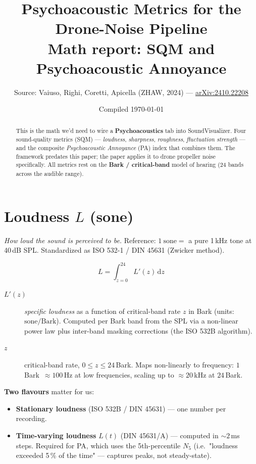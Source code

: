 \documentclass[11pt,a4paper]{article}
\title{\textbf{Psychoacoustic Metrics for the Drone-Noise Pipeline}\\
       \large Math report: SQM and Psychoacoustic Annoyance}
\author{Source: Vaiuso, Righi, Coretti, Apicella (ZHAW, 2024) ---
        \href{https://arxiv.org/abs/2410.22208}{arXiv:2410.22208}}
\date{Compiled \today}
\begin{document}
\maketitle

\begin{abstract}
\noindent
This is the math we'd need to wire a \textbf{Psychoacoustics} tab into SoundVisualizer.
Four sound-quality metrics (SQM) --- \emph{loudness}, \emph{sharpness}, \emph{roughness},
\emph{fluctuation strength} --- and the composite \emph{Psychoacoustic Annoyance} (PA)
index that combines them. The framework predates this paper; the paper applies it to
drone propeller noise specifically. All metrics rest on the \textbf{Bark / critical-band}
model of hearing (24 bands across the audible range).
\end{abstract}

\section{Loudness \texorpdfstring{$L$}{L} (sone)}

\textit{How loud the sound is perceived to be.} Reference: $1\ \text{sone} = $ a pure 1\,kHz
tone at 40\,dB SPL. Standardized as ISO 532-1 / DIN 45631 (Zwicker method).

\[
  L = \int_{z=0}^{24} L'(z)\, \mathrm{d}z
\]

\begin{description}
  \item[$L'(z)$] \emph{specific loudness} as a function of critical-band rate $z$ in
                Bark (units: $\text{sone}/\text{Bark}$). Computed per Bark band from
                the SPL via a non-linear power law plus inter-band masking corrections
                (the ISO 532B algorithm).
  \item[$z$]    critical-band rate, $0 \le z \le 24$\,Bark. Maps non-linearly to
                frequency: $1$\,Bark~$\approx 100$\,Hz at low frequencies, scaling
                up to $\approx 20$\,kHz at $24$\,Bark.
\end{description}

\noindent\textbf{Two flavours} matter for us:
\begin{itemize}
  \item \textbf{Stationary loudness} (ISO 532B / DIN 45631) --- one number per recording.
  \item \textbf{Time-varying loudness} $L(t)$ (DIN 45631/A) --- computed in $\sim 2$\,ms
        steps. Required for PA, which uses the 5th-percentile $N_5$ (i.e.\ "loudness
        exceeded 5\,\% of the time" --- captures peaks, not steady-state).
\end{itemize}
\end{document}
